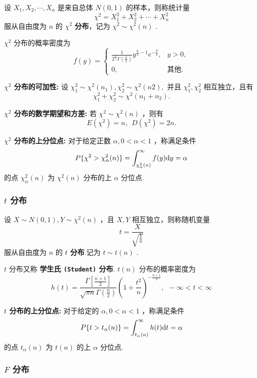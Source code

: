 \documentclass[UTF8,10pt]{ctexart}
\begin{document}
	设 $ X_{1},X_{2}, \cdots ,X_{n} $ 是来自总体 $ N(0,1) $ 的样本，则称统计量 $$ \chi ^{2}=X_{1}^{2}+X_{2}^{2}+ \cdots +X_{n}^{2} $$ 服从自由度为 $ n $ 的 $ \chi ^{2} $ \textbf{分布}，记为 $ \chi ^{2} \sim \chi ^{2}(n) $ .
	
	$ \chi ^{2} $ 分布的概率密度为 $$ f(y)= \begin{cases} \frac{1}{2^{ \frac{n}{2} } \Gamma( \frac{n}{2} ) }y^{ \frac{n}{2} -1 }e^{- \frac{y}{2} }, & y>0, \\ 0, & \mbox{其他}. \end{cases} $$
	
	\textbf{ $ \chi ^{2} $ 分布的可加性:} 设 $ \chi _{1}^{2} \sim \chi ^{2}(n_{1}), \chi _{2}^{2} \sim \chi ^{2}(n2), $ 并且 $ \chi _{1}^{2}, \chi _{2}^{2} $ 相互独立，且有 $$ \chi _{1}^{2}+ \chi _{2}^{2} \sim \chi ^{2}(n_{1}+n_{2}). $$
	
	\textbf{ $ \chi ^{2} $ 分布的数学期望和方差:} 若 $ \chi ^{2} \sim \chi ^{2}(n) $ ，则有 $$ E( \chi ^{2} )=n,\ \ D( \chi ^{2})=2n. $$
	
	\textbf{ $ \chi ^{2} $ 分布的上分位点:} 对于给定正数 $ \alpha ,0< \alpha <1 $ ，称满足条件 $$ P\{ \chi ^{2}> \chi _{ \alpha }^{2}(n) \}= \int_{ \chi _{ \alpha }^{2}(n) }^{ \infty }f(y){\rm d}y= \alpha $$ 的点 $ \chi _{ \alpha }^{2}(n) $ 为 $ \chi ^{2}(n) $ 分布的上 $ \alpha $ 分位点.
	
	\subsubsection{ $ t $ 分布}
	
	设 $ X \sim N(0,1),Y \sim \chi ^{2}(n) $ ，且 $ X,Y $ 相互独立，则称随机变量 $$ t= \frac{X}{ \sqrt{ \frac{Y}{n} } } $$ 服从自由度为 $ n $ 的 \textbf{ $ t $ 分布}.记为 $ t \sim t(n) $ .
	
	$ t $ 分布又称 \textbf{学生氏 \texttt{(Student)} 分布}. $ t(n) $ 分布的概率密度为 $$ h(t)= \frac{ \Gamma[ \frac{n+1}{2} ] }{ \sqrt{ \pi n } \Gamma ( \frac{n}{2} ) } (1+ \frac{t^{2}}{n} )^{- \frac{n+1}{2}},\ \ - \infty <t< \infty $$
	
	\textbf{ $ t $ 分布的上分位点:} 对于给定的 $ \alpha,0< \alpha<1 $ ，称满足条件 $$ P\{t> t_{ \alpha }(n)\}= \int_{t_{ \alpha }(n)}^{ \infty }h(t){\rm d}t= \alpha $$ 的点 $ t_{ \alpha }(n) $ 为 $ t(n) $ 的上 $ \alpha $ 分位点.
	
	\subsubsection{ $ F $ 分布}
	
\end{document}
